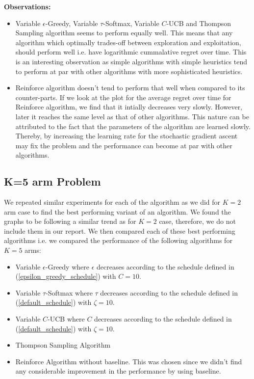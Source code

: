 \documentclass{article}
\begin{document}
		\textbf{Observations:}
		\begin{itemize}
			\item Variable $\epsilon$-Greedy, Variable $\tau$-Softmax, Variable $C$-UCB and Thompson Sampling algorithm seems to perform equally well. This means
				that any algorithm which optimally trades-off between exploration and exploitation, should perform well i.e. have logarithmic cummalative regret over 
				time. This is an interesting observation as simple algorithms with simple heuristics tend to perform at par with other algorithms with more 
				sophisticated heuristics.
			\item Reinforce algorithm doesn't tend to perform that well when compared to its counter-parts. If we look at the plot for the average regret over time
				for Reinforce algorithm, we find that it intially decreases very slowly. However, later it reaches the same level as that of other algorithms. This
				nature can be attributed to the fact that the parameters of the algorithm are learned slowly. Thereby, by increasing the learning rate for the 
				stochastic gradient ascent may fix the problem and the performance can become at par with other algorithms.	
		\end{itemize}
		
	\subsection{K=5 arm Problem}
		\label{5_bernoulli_comparison}
		We repeated similar experiments for each of the algorithm as we did for $K=2$ arm case to find the best performing variant of an algorithm. We found the 
		graphs to be following a similar trend as for $K=2$ case, therefore, we do not include them in our report. We then compared each of these best performing
		algorithms i.e. we compared the performance of the following algorithms for $K=5$ arms:
		\begin{itemize}
			\item Variable $\epsilon$-Greedy where $\epsilon$ decreases according to the schedule defined in (\ref{epsilon_greedy_schedule}) with $C=10$.
			\item Variable $\tau$-Softmax where $\tau$ decreases according to the schedule defined in (\ref{default_schedule}) with $\zeta=10$.
			\item Variable $C$-UCB where $C$ decreases according to the schedule defined in (\ref{default_schedule}) with $\zeta=10$.
			\item Thompson Sampling Algorithm
			\item Reinforce Algorithm without baseline. This was chosen since we didn't find any considerable improvement in the performance by using baseline.
		\end{itemize}
		
\end{document}
